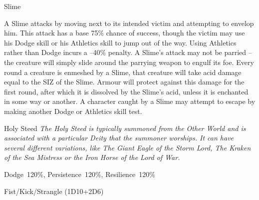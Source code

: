 \begin{monsterbox}{Slime}
\begin{rpg-monsteraction}
	\end{rpg-monsteraction}
	\begin{rpg-monsteraction}
		A Slime attacks by moving next to its intended victim and attempting to envelop him. This attack has a base 75\% chance of success, though the victim may use his Dodge skill or his Athletics skill to jump out of the way. Using Athletics rather than Dodge incurs a –40\% penalty. A Slime’s attack may not be parried – the creature will simply slide around the parrying weapon to engulf its foe. Every round a creature is enmeshed by a Slime, that creature will take acid damage equal to the SIZ of the Slime. Armour will protect against this damage for the first round, after which it is dissolved by the Slime’s acid, unless it is enchanted in some way or another. A character caught by a Slime may attempt to escape by making another Dodge or Athletics skill test.
	\end{rpg-monsteraction}

\end{monsterbox}

\newpage



\begin{monsterbox}{Holy Steed}
	\label{monster:holy-steed}
	\textit{The Holy Steed is typically summoned from the Other World and is associated with a particular Deity that the summoner worships. It can have several different variations, like The Giant Eagle of the Storm Lord, The Kraken of the Sea Mistress or the Iron Horse of the Lord of War.}\\
	\rpghline
	\basics[%
        hitpoints  = 25,
	majorwound = 13,
	damagemodifier = +2D6,
	powerpoints = 18,
	movementrate = 20m,
	armor = Special (6AP),
	plunderrating = 0
	]
	\rpghline%
	\stats[ %
		STR = 30,
		CON = 20,
		DEX = 18,
		SIZ = 30,
		INT = 18,
		POW = 18,
		CHA = 18
	]
	\rpghline%
	\begin{rpg-monsteraction}[Resistances]
		Dodge~120\%, Persistence~120\%, Resilience~120\%
	\end{rpg-monsteraction}
	\begin{rpg-monsteraction}
		Fist/Kick/Strangle (1D10+2D6)
	\end{rpg-monsteraction}
\end{monsterbox}

\newpage

